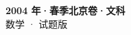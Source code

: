 \documentclass[zihao=-4, a4paper]{ctexart}
\begin{document}
\begin{center}
  {\Large\bfseries 2004 年·春季北京卷·文科}\\[4pt]
  {\large 数学 · 试题版}
\end{center}
\medskip
{}

\end{document}
